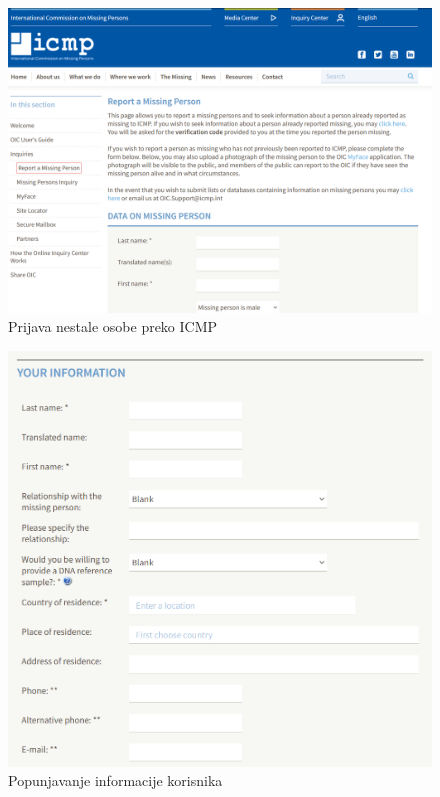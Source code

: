             \begin{figure}[H]
			         \includegraphics[scale=0.5]{slike/ICMP.png} %
			         \centering
			         \caption{Prijava nestale osobe preko ICMP}
			         \label{fig:promjene}
		      \end{figure}


            \begin{figure}[H]
			         \includegraphics[scale=0.5]{slike/ICMP_2.png} %
			         \centering
			         \caption{Popunjavanje informacije korisnika}
			         \label{fig:promjene}
		      \end{figure}


